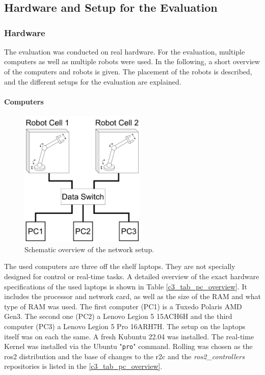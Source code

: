 \chapter{}
\label{sec:results}
\section{Hardware and Setup for the Evaluation}\label{c6_sec_setup_all}
\subsection{Hardware}
The evaluation was conducted on real hardware. For the evaluation, multiple computers as well as multiple robots were used. In the following, a short overview of the computers and robots is given. The placement of the robots is described, and the different setups for the evaluation are explained.




\subsubsection{Computers}
\begin{figure}
\includegraphics[width=6cm]{Figures/c6/network_setup.pdf}
\caption{Schematic overview of the network setup.} \label{c6_fig_network}
\end{figure}
The used computers are three off the shelf laptops. They are not specially designed for control or real-time tasks. A detailed overview of the exact hardware specifications of the used laptops is shown in Table \ref{c3_tab_pc_overview}. 
It includes the processor and network card, as well as the size of the RAM and what type of RAM was used. The first computer (PC1) is a Tuxedo Polaris AMD Gen3. The second one (PC2) a Lenovo Legion 5 15ACH6H and the third computer (PC3) a Lenovo Legion 5 Pro 16ARH7H.\newline
The setup on the laptops itself was on each the same. A fresh Kubuntu 22.04 was installed. The real-time Kernel was installed via the Ubuntu "\texttt{pro}" command. Rolling was chosen as the \gls{ros2} distribution and the base of changes to the \gls{r2c} and the \textit{ros2\_controllers} repositories is listed in the \autoref{c3_tab_pc_overview}.



